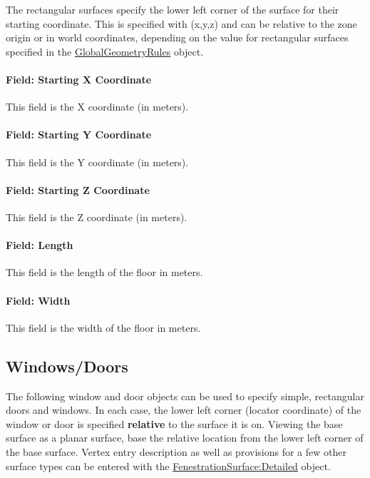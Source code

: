The rectangular surfaces specify the lower left corner of the surface for their starting coordinate. This is specified with (x,y,z) and can be relative to the zone origin or in world coordinates, depending on the value for rectangular surfaces specified in the \hyperref[globalgeometryrules]{GlobalGeometryRules} object.

\paragraph{Field: Starting X Coordinate}\label{field-starting-x-coordinate-9}

This field is the X coordinate (in meters).

\paragraph{Field: Starting Y Coordinate}\label{field-starting-y-coordinate-9}

This field is the Y coordinate (in meters).

\paragraph{Field: Starting Z Coordinate}\label{field-starting-z-coordinate-9}

This field is the Z coordinate (in meters).

\paragraph{Field: Length}\label{field-length-9}

This field is the length of the floor in meters.

\paragraph{Field: Width}\label{field-width-5}

This field is the width of the floor in meters.

\subsection{Windows/Doors}\label{windowsdoors}

The following window and door objects can be used to specify simple, rectangular doors and windows. In each case, the lower left corner (locator coordinate) of the window or door is specified \textbf{relative} to the surface it is on. Viewing the base surface as a planar surface, base the relative location from the lower left corner of the base surface. Vertex entry description as well as provisions for a few other surface types can be entered with the \hyperref[fenestrationsurfacedetailed]{FenestrationSurface:Detailed} object.

